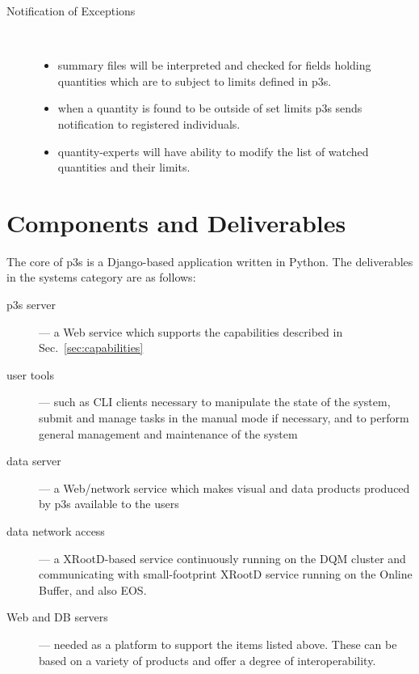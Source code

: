 \documentclass[pdftex,12pt,letter]{article}
\begin{document}
\begin{description}
\begin{itemize}
\end{itemize} 

\item[Notification of Exceptions]\ 
\begin{itemize}

\item summary files will be interpreted and checked for fields holding quantities which are to subject to limits defined in p3s.

\item when a quantity is found to be outside of set limits p3s sends notification to registered individuals. 

\item quantity-experts will have ability to modify the list of watched quantities and their limits.

\end{itemize} 

\end{description}

\section{Components and Deliverables}

The core of p3s is a Django-based \cite{django} application written in Python. The
deliverables in the systems category are as follows:

\begin{description}
\item[p3s server] --- a Web service which supports the capabilities described in Sec.~\ref{sec:capabilities}

\item[user tools] --- such as CLI clients necessary to manipulate the state of the system, submit
and manage tasks in the manual mode if necessary, and to perform general management and
maintenance of the system

\item[data server] --- a Web/network service which makes visual and data products produced by p3s
available to the users

\item[data network access] --- a XRootD-based service continuously running on the DQM cluster
and communicating with small-footprint XRootD service running on the Online Buffer, and also EOS.

\item[Web and DB servers] --- needed as a platform to support the items listed above. These
can be based on a variety of products and offer a degree of interoperability.

\end{description}
\end{document}
